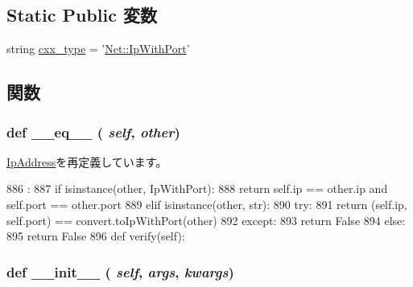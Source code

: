 \subsection*{Static Public 変数}
\begin{DoxyCompactItemize}
\item 
string \hyperlink{classm5_1_1params_1_1IpWithPort_a2f1553ebb79374a68b36fdd6d8d82fc3}{cxx\_\-type} = '\hyperlink{structNet_1_1IpWithPort}{Net::IpWithPort}'
\end{DoxyCompactItemize}


\subsection{関数}
\hypertarget{classm5_1_1params_1_1IpWithPort_a449f8fd74d358c0ad641b6c6d6917ba0}{
\subsubsection[{\_\-\_\-eq\_\-\_\-}]{\setlength{\rightskip}{0pt plus 5cm}def \_\-\_\-eq\_\-\_\- ( {\em self}, \/   {\em other})}}
\label{classm5_1_1params_1_1IpWithPort_a449f8fd74d358c0ad641b6c6d6917ba0}


\hyperlink{classm5_1_1params_1_1IpAddress_a449f8fd74d358c0ad641b6c6d6917ba0}{IpAddress}を再定義しています。


\begin{DoxyCode}
886                            :
887         if isinstance(other, IpWithPort):
888             return self.ip == other.ip and self.port == other.port
889         elif isinstance(other, str):
890             try:
891                 return (self.ip, self.port) == convert.toIpWithPort(other)
892             except:
893                 return False
894         else:
895             return False
896 
    def verify(self):
\end{DoxyCode}
\hypertarget{classm5_1_1params_1_1IpWithPort_ac775ee34451fdfa742b318538164070e}{
\subsubsection[{\_\-\_\-init\_\-\_\-}]{\setlength{\rightskip}{0pt plus 5cm}def \_\-\_\-init\_\-\_\- ( {\em self}, \/   {\em args}, \/   {\em kwargs})}}
\label{classm5_1_1params_1_1IpWithPort_ac775ee34451fdfa742b318538164070e}



